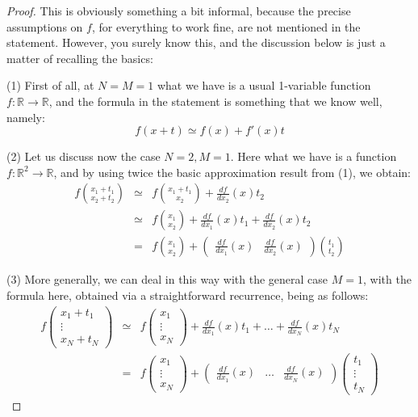 \documentclass[12pt]{amsbook}
\begin{document}
\begin{proof}
This is obviously something a bit informal, because the precise assumptions on $f$, for everything to work fine, are not mentioned in the statement. However, you surely know this, and the discussion below is just a matter of recalling the basics:

\medskip

(1) First of all, at $N=M=1$ what we have is a usual 1-variable function $f:\mathbb R\to\mathbb R$, and the formula in the statement is something that we know well, namely:
$$f(x+t)\simeq f(x)+f'(x)t$$

(2) Let us discuss now the case $N=2,M=1$. Here what we have is a function $f:\mathbb R^2\to\mathbb R$, and by using twice the basic approximation result from (1), we obtain:
\begin{eqnarray*}
f\binom{x_1+t_1}{x_2+t_2}
&\simeq&f\binom{x_1+t_1}{x_2}+\frac{df}{dx_2}(x)t_2\\
&\simeq&f\binom{x_1}{x_2}+\frac{df}{dx_1}(x)t_1+\frac{df}{dx_2}(x)t_2\\
&=&f\binom{x_1}{x_2}+\begin{pmatrix}\frac{df}{dx_1}(x)&\frac{df}{dx_2}(x)\end{pmatrix}\binom{t_1}{t_2}
\end{eqnarray*}

(3) More generally, we can deal in this way with the general case $M=1$, with the formula here, obtained via a straightforward recurrence, being as follows:
\begin{eqnarray*}
f\begin{pmatrix}x_1+t_1\\ \vdots\\ x_N+t_N\end{pmatrix}
&\simeq&f\begin{pmatrix}x_1\\ \vdots\\ x_N\end{pmatrix}+\frac{df}{dx_1}(x)t_1+\ldots+\frac{df}{dx_N}(x)t_N\\
&=&f\begin{pmatrix}x_1\\ \vdots\\ x_N\end{pmatrix}+
\begin{pmatrix}\frac{df}{dx_1}(x)&\ldots&\frac{df}{dx_N}(x)\end{pmatrix}
\begin{pmatrix}t_1\\ \vdots\\ t_N\end{pmatrix}
\end{eqnarray*}


\end{proof}
\end{document}
